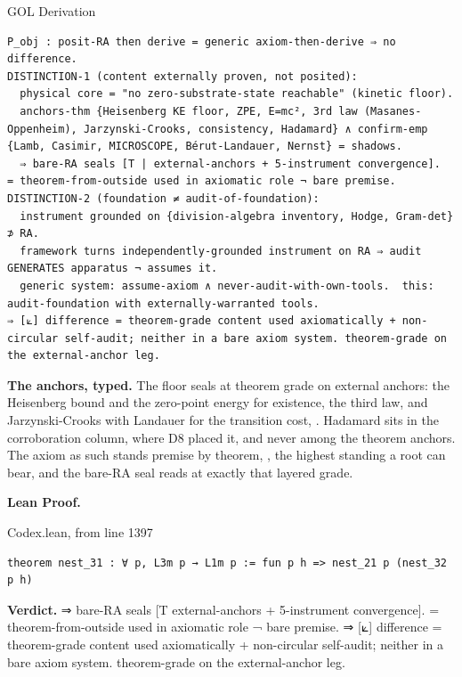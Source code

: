 \documentclass[10pt,twocolumn]{article}
\begin{document}
\begin{golbox}{GOL Derivation}
\begin{lstlisting}[style=golv]
P_obj : posit-RA then derive = generic axiom-then-derive ⇒ no difference.
DISTINCTION-1 (content externally proven, not posited):
  physical core = "no zero-substrate-state reachable" (kinetic floor).
  anchors-thm {Heisenberg KE floor, ZPE, E=mc², 3rd law (Masanes-Oppenheim), Jarzynski-Crooks, consistency, Hadamard} ∧ confirm-emp {Lamb, Casimir, MICROSCOPE, Bérut-Landauer, Nernst} = shadows.
  ⇒ bare-RA seals [T | external-anchors + 5-instrument convergence].  = theorem-from-outside used in axiomatic role ¬ bare premise.
DISTINCTION-2 (foundation ≠ audit-of-foundation):
  instrument grounded on {division-algebra inventory, Hodge, Gram-det} ⊅ RA.
  framework turns independently-grounded instrument on RA ⇒ audit GENERATES apparatus ¬ assumes it.
  generic system: assume-axiom ∧ never-audit-with-own-tools.  this: audit-foundation with externally-warranted tools.
⇒ [⟀] difference = theorem-grade content used axiomatically + non-circular self-audit; neither in a bare axiom system. theorem-grade on the external-anchor leg.
\end{lstlisting}
\end{golbox}

\textbf{The anchors, typed.} The floor seals at theorem grade on
external anchors: the Heisenberg bound and the zero-point energy for
existence, the third law, and Jarzynski-Crooks with Landauer for the
transition cost, \texttt{}. Hadamard
sits in the corroboration column, where D8 placed it, and never among
the theorem anchors. The axiom as such stands premise by theorem,
\texttt{}, the highest standing a
root can bear, and the bare-RA seal reads at exactly that layered grade.

\textbf{Lean Proof.}

\begin{leanexcerpt}{Codex.lean, from line 1397}
\begin{lstlisting}[style=leanx,firstnumber=1397]
theorem nest_31 : ∀ p, L3m p → L1m p := fun p h => nest_21 p (nest_32 p h)
\end{lstlisting}
\end{leanexcerpt}

\textbf{Verdict.} ⇒ bare-RA seals {[}T \textbar{} external-anchors +
5-instrument convergence{]}. = theorem-from-outside used in axiomatic
role ¬ bare premise. ⇒ {[}⟀{]} difference = theorem-grade content used
axiomatically + non-circular self-audit; neither in a bare axiom system.
theorem-grade on the external-anchor leg.
\end{document}

